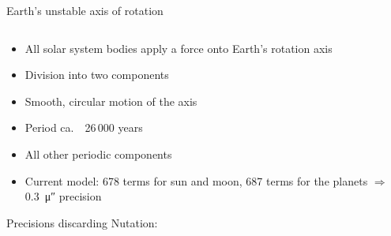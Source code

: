 \documentclass[aspectratio=1610, 9pt]{beamer}
\begin{document}
\begin{frame}{Earth's unstable axis of rotation}
  \begin{columns}[c, onlytextwidth]
    \begin{column}{0.5\textwidth}
      \begin{itemize}
        \item All solar system bodies apply a force onto Earth's rotation axis
        \item Division into two components
      \end{itemize}

      \bigskip

      \begin{itemize}
        \item Smooth, circular motion of the axis
        \item Period ca.\ ~26\,000 years
      \end{itemize}

      \bigskip
      \begin{itemize}
        \item All other periodic components
        \item Current model: 678 terms for sun and moon, 687 terms for the planets
          $⇒$ \SI{0.3}{\micro\arcsecond} precision
      \end{itemize}

      \bigskip
      Precisions discarding Nutation:


\end{column}
\end{columns}
\end{frame}
\end{document}
